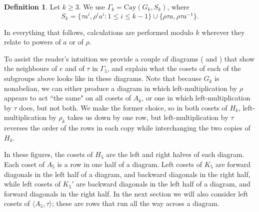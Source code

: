 \documentclass{amsart}
\theoremstyle{remark}
\theoremstyle{definition}
\newtheorem{defn}[thm]{Definition}
\newcommand{\Cay}[2]{\mathrm{Cay}(#1,#2)}		%
\begin{document}
\begin{defn}
    Let $k \ge 3$. We use $\Gamma_k=\Cay{G_k}{S_k}$, where 
    $$S_k=\{\tau a^i,\rho^i a^i:1 \le i \le k-1\} \cup \{\rho\tau a,\rho\tau a^{-1}\}.$$
\end{defn}

In everything that follows, calculations are performed modulo $k$ wherever they relate to powers of $a$ or of $\rho$.

To assist the reader's intuition we provide a couple of diagrams ( and ) that show the neighbours of $e$ and of $\tau$ in $\Gamma_5$, and explain what the cosets of each of the subgroups above looks like in these diagrams. Note that because $G_k$ is nonabelian, we can either produce a diagram in which left-multiplication by $\rho$ appears to act ``the same" on all cosets of $A_k$, or one in which left-multiplication by $\tau$ does, but not both. We make the former choice, so in both cosets of $H_k$, left-multiplication by $\rho_k$ takes us down by one row, but left-multiplication by $\tau$ reverses the order of the rows in each copy while interchanging the two copies of $H_k$.

In these figures, the cosets of $H_5$ are the left and right halves of each diagram. Each coset of $A_5$ is a row in one half of a diagram. Left cosets of $K_5$ are forward diagonals in the left half of a diagram, and backward diagonals in the right half, while left cosets of $K_5'$ are backward diagonals in the left half of a diagram, and forward diagonals in the right half. In the next section we will also consider left cosets of $\langle A_5, \tau\rangle$; these are rows that run all the way across a diagram.
\end{document}
